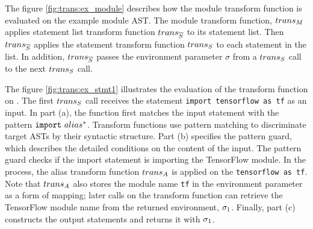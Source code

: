 The figure \ref{fig:trans:ex_module} 
describes how the module transform function 
is evaluated on the example module AST.
The module transform function, $trans_M$
applies statement list transform function $trans_{\overline{S}}$ to its statement list.
Then $trans_{\overline{S}}$ applies the statement transform function $trans_S$
to each statement in the list.
In addition, $trans_{\overline{S}}$ passes the environment parameter $\sigma$
from a $trans_S$ call to the next $trans_S$ call.

The figure \ref{fig:trans:ex_stmt1} illustrates the evaluation of
the transform function on .
The first $trans_S$ call receives the statement
{\tt import tensorflow as tf} as an input.
In part (a), the function first matches the input statement
with the pattern ${\tt import} ~ alias^*$.
Transform functions use pattern matching to discriminate target ASTs
by their syntactic structure.
Part (b) specifies the pattern guard, which describes the detailed conditions
on the content of the input.
The pattern guard checks if the import statement
is importing the TensorFlow module.
In the process, the alias transform function $trans_A$ is applied on the
{\tt tensorflow as tf}.
Note that $trans_A$ also stores the module name {\tt tf}
in the environment parameter as a form of mapping;
later calls on the transform function can retrieve the
TensorFlow module name from the returned environment, $\sigma_{1}$.
Finally, part (c) constructs the output statements
and returns it with $\sigma_{1}$.


